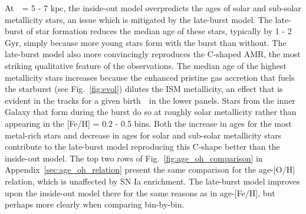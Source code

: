 \documentclass[draft2.tex]{subfiles}
\begin{document}
{\color{red} 
At~\rgal~= 5 - 7 kpc, the inside-out model overpredicts the ages of solar and 
sub-solar metallicity stars, an issue which is mitigated by the late-burst 
model. 
The late-burst of star formation reduces the median age of these stars, 
typically by 1 - 2 Gyr, simply because more young stars form with the burst 
than without. 
The late-burst model also more convincingly reproduces the C-shaped AMR, the 
most striking qualitative feature of the observations. 
} 
The median age of the highest metallicity stars increases because the enhanced 
pristine gas accretion that fuels the starburst (see Fig.~\ref{fig:evol}) 
dilutes the ISM metallicity, an effect that is evident in the tracks for a 
given birth~\rgal~in the lower panels. 
Stars from the inner Galaxy that form during the burst do so at roughly solar 
metallicity rather than appearing in the [Fe/H] = 0.2 - 0.5 bins. 
{\color{red} 
Both the increase in ages for the most metal-rich stars and decrease in ages 
for solar and sub-solar metallicity stars contribute to the late-burst model 
reproducing this C-shape better than the inside-out model. 
The top two rows of Fig.~\ref{fig:age_oh_comparison} in 
Appendix~\ref{sec:age_oh_relation} present the same comparison for the 
age-[O/H] relation, which is unaffected by SN Ia enrichment. 
The late-burst model improves upon the inside-out model there for the same 
reasons as in age-[Fe/H], but perhaps more clearly when comparing bin-by-bin. 
} 
\par 
\end{document}
